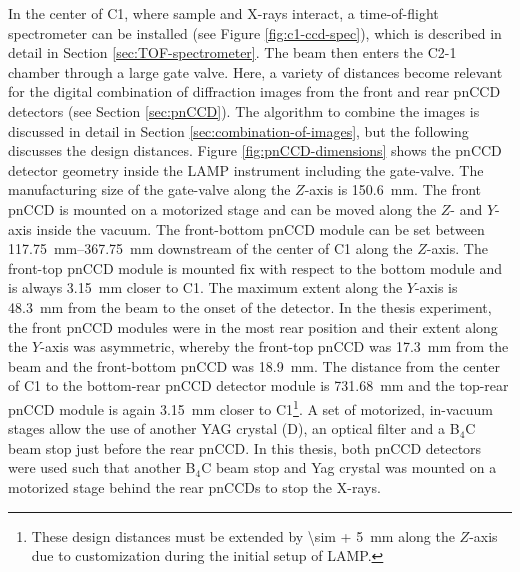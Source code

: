 In the center of C1, where sample and X-rays interact, a time-of-flight spectrometer can be installed (see Figure \ref{fig:c1-ccd-spec}), which is described in detail in Section \ref{sec:TOF-spectrometer}. The beam then enters the C2-1 chamber through a large gate valve. Here, a variety of distances become relevant for the digital combination of diffraction images from the front and rear pnCCD detectors (see Section \ref{sec:pnCCD}). The algorithm to combine the images is discussed in detail in Section \ref{sec:combination-of-images}, but the following discusses the design distances. Figure \ref{fig:pnCCD-dimensions} shows the pnCCD detector geometry inside the LAMP instrument including the gate-valve. The manufacturing size of the gate-valve along the $Z$-axis is \SI{150.6}{\milli\meter}. The front pnCCD is mounted on a motorized stage and can be moved along the $Z$- and $Y$-axis inside the vacuum. The front-bottom pnCCD module can be set between \SIrange{117.75}{367.75}{\milli\meter} downstream of the center of C1 along the $Z$-axis. The front-top pnCCD module is mounted fix with respect to the bottom module and is always \SI{3.15}{\milli\meter} closer to C1. The maximum extent along the $Y$-axis is \SI{48.3}{\milli\meter} from the beam to the onset of the detector. In the thesis experiment, the front pnCCD modules were in the most rear position and their extent along the $Y$-axis was asymmetric, whereby the front-top pnCCD was \SI{17.3}{\milli\meter} from the beam and the front-bottom pnCCD was \SI{18.9}{\milli\meter}. The distance from the center of C1 to the bottom-rear pnCCD detector module is \SI{731.68}{\milli\meter} and the top-rear pnCCD module is again \SI{3.15}{\milli\meter} closer to C1\footnote{These design distances must be extended by \SI{\sim + 5}{\milli\meter} along the $Z$-axis due to customization during the initial setup of LAMP.}. A set of motorized, in-vacuum stages allow the use of another YAG crystal (D), an optical filter and a B$_{4}$C beam stop just before the rear pnCCD. In this thesis, both pnCCD detectors were used such that another B$_{4}$C beam stop and Yag crystal was mounted on a motorized stage behind the rear pnCCDs to stop the X-rays.
%
%
%
